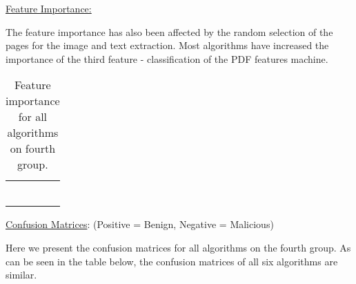 \documentclass{article}
\begin{document}
\noindent\underline{Feature Importance:}

\indent	The feature importance has also been affected by the random selection of the pages for the image and text extraction. Most algorithms have increased the importance of the third feature - classification of the PDF features machine.

\begin{table}[htb]
\centering
\begin{tabular}{|M{2.5cm}|M{2.5cm}|M{2.5cm}|M{2.5cm}|}
	\hline
	\centering{} &  &  & \tabularnewline
	\hline
	 &  &  & \tabularnewline
	\hline
	 &  &  & \tabularnewline
	\hline
	 &  &  & \tabularnewline
	\hline
	 &  &  & \tabularnewline
	\hline
	 &  &  & \tabularnewline
	\hline
	 &  &  & \tabularnewline
	\hline	
\end{tabular}
\caption{Feature importance for all algorithms on fourth group.}
\end{table}

\noindent\underline{Confusion Matrices}: (Positive = Benign, Negative = Malicious)

\indent Here we present the confusion matrices for all algorithms on the fourth group. As can be seen in the table below, the confusion matrices of all six algorithms are similar.
\end{document}
